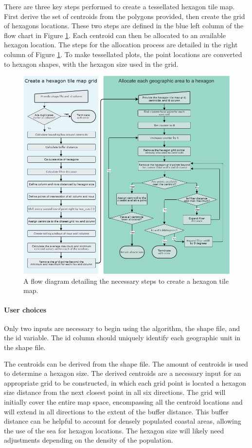 There are three key steps performed to create a tessellated hexagon tile
map. First derive the set of centroids from the polygons provided, then
create the grid of hexagons locations. These two steps are defined in
the blue left column of the flow chart in Figure
\ref{fig:sugarbag_flow}. Each centroid can then be allocated to an
available hexagon location. The steps for the allocation process are
detailed in the right column of Figure \ref{fig:sugarbag_flow}. To make
tessellated plots, the point locations are converted to hexagon shapes,
with the hexagon size used in the grid.

\begin{figure}
\includegraphics[width=14cm]{figs/sugarbag flow.png}
\caption{\label{fig:sugarbag_flow}A flow diagram detailing the necessary steps to create a hexagon tile map.}
\end{figure}

\hypertarget{user-choices}{%
\paragraph{User choices}\label{user-choices}}

Only two inputs are necessary to begin using the algorithm, the shape
file, and the id variable. The id column should uniquely identify each
geographic unit in the shape file.

The centroids can be derived from the shape file. The amount of
centroids is used to determine a hexagon size. The derived centroids are
a necessary input for an appropriate grid to be constructed, in which
each grid point is located a hexagon size distance from the next closest
point in all six directions. The grid will initially cover the entire
map space, encompassing all the centroid locations and will extend in
all directions to the extent of the buffer distance. This buffer
distance can be helpful to account for densely populated coastal areas,
allowing the use of the sea for hexagon locations. The hexagon size will
likely need adjustments depending on the density of the population.

